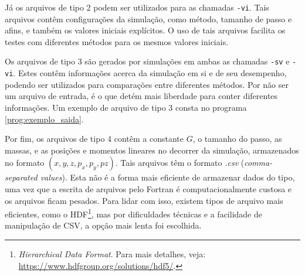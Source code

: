 Já os arquivos de tipo 2 podem ser utilizados para as chamadas \verb|-vi|. Tais arquivos contêm configurações da simulação, como método, tamanho de passo e afins, e também os valores iniciais explícitos. O uso de tais arquivos facilita os testes com diferentes métodos para os mesmos valores iniciais.

Os arquivos de tipo 3 são gerados por simulações em ambas as chamadas \verb|-sv| e \verb|-vi|. Estes contêm informações acerca da simulação em si e de seu desempenho, podendo ser utilizados para comparações entre diferentes métodos. Por não ser um arquivo de entrada, é o que detém mais liberdade para conter diferentes informações. Um exemplo de arquivo de tipo 3 consta no programa \ref{prog:exemplo_saida}.



Por fim, os arquivos de tipo 4 contêm a constante $G$, o tamanho do passo, as massas, e as posições e momentos lineares no decorrer da simulação, armazenados no formato $(x, y, z, p_x, p_y, pz)$. Tais arquivos têm o formato \textit{.csv} (\textit{comma-separated values}). Esta não é a forma mais eficiente de armazenar dados do tipo, uma vez que a escrita de arquivos pelo Fortran é computacionalmente custosa e os arquivos ficam pesados. Para lidar com isso, existem tipos de arquivo mais eficientes, como o HDF\footnote{\textit{Hierarchical Data Format}. Para mais detalhes, veja: \href{https://www.hdfgroup.org/solutions/hdf5/}{https://www.hdfgroup.org/solutions/hdf5/}.}, mas por dificuldades técnicas e a facilidade de manipulação de CSV, a opção mais lenta foi escolhida.